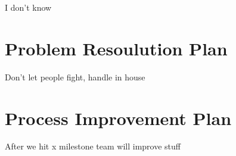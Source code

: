 I don't know


\section{Problem Resoulution Plan}

Don't let people fight, handle in house


\section{Process Improvement Plan}

After we hit x milestone team will improve stuff


